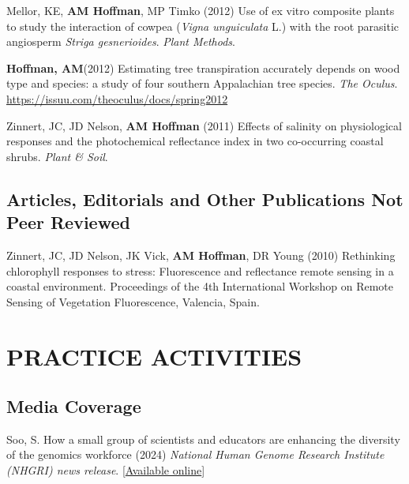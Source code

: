 \documentclass{cv}
\begin{document}
\begin{pubenum}
\item Mellor, KE, \textbf{AM Hoffman}, MP Timko (2012) Use of ex vitro composite plants to study the interaction of cowpea (\textit{Vigna unguiculata} L.) with the root parasitic angiosperm \textit{Striga gesnerioides}. \textit{Plant Methods}. 

\sloppy %
\item\textbf{Hoffman, AM}\footnotemark[1] (2012) Estimating tree transpiration accurately depends on wood type and species: a study of four southern Appalachian tree species. \textit{The Oculus}. \href{https://issuu.com/theoculus/docs/spring2012}{https://issuu.com/theoculus/docs/spring2012}

\item Zinnert, JC, JD Nelson, \textbf{AM Hoffman} (2011) Effects of salinity on physiological responses and the photochemical reflectance index in two co-occurring coastal shrubs. \textit{Plant \& Soil}. 

\end{pubenum}

\subsection*{Articles, Editorials and Other Publications Not Peer Reviewed}

Zinnert, JC, JD Nelson, JK Vick, \textbf{AM Hoffman}, DR Young (2010) Rethinking chlorophyll responses to stress: Fluorescence and reflectance remote sensing in a coastal environment. Proceedings of the 4th International Workshop on Remote Sensing of Vegetation Fluorescence, Valencia, Spain.


\section*{PRACTICE ACTIVITIES}

\subsection*{Media Coverage}

Soo, S. How a small group of scientists and educators are enhancing the diversity of the genomics workforce (2024) \textit{National Human Genome Research Institute (NHGRI) news release}. [\href{https://www.genome.gov/news/news-release/how-a-small-group-of-scientists-and-educators-are-enhancing-the-diversity-of-the-genomics-workforce}{Available online}]
\end{document}
